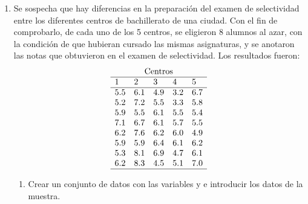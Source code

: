 \begin {enumerate}[leftmargin=*]
\begin{enumerate}
\item Dibujar el gráfico de los intervalos de confianza para la media de cada tratamiento. 
\begin{indicacion}
\begin{enumerate}
\item Seleccionar el menú .
\item En el cuadro de diálogo que aparece, seleccionar la variable  en el campo  y seleccionar la variable  en el campo .
\item Seleccionar la opción  y hacer click sobre el botón .
\end{enumerate}
\end{indicacion}
\end{enumerate}


\item Se sospecha que hay diferencias en la preparación del examen de selectividad entre los diferentes centros de
bachillerato de una ciudad.
Con el fin de comprobarlo, de cada uno de los 5 centros, se eligieron 8 alumnos al azar, con la condición de que
hubieran cursado las mismas asignaturas, y se anotaron las notas que obtuvieron en el examen de selectividad. 
Los resultados fueron:
\[
\begin{array}{lllll}
\multicolumn{5}{c}{\text{Centros}} \\
\hline
1 & 2 & 3 & 4 & 5 \\
\hline
5.5 & 6.1 & 4.9 & 3.2 & 6.7 \\
5.2 & 7.2 & 5.5 & 3.3 & 5.8 \\
5.9 & 5.5 & 6.1 & 5.5 & 5.4 \\
7.1 & 6.7 & 6.1 & 5.7 & 5.5 \\
6.2 & 7.6 & 6.2 & 6.0 & 4.9 \\
5.9 & 5.9 & 6.4 & 6.1 & 6.2 \\
5.3 & 8.1 & 6.9 & 4.7 & 6.1 \\
6.2 & 8.3 & 4.5 & 5.1 & 7.0 \\
\hline
\end{array}
\]

\begin{enumerate}
\item Crear un conjunto de datos con las variables  y  e introducir los datos de la muestra.


\end{enumerate}
\end{enumerate}
